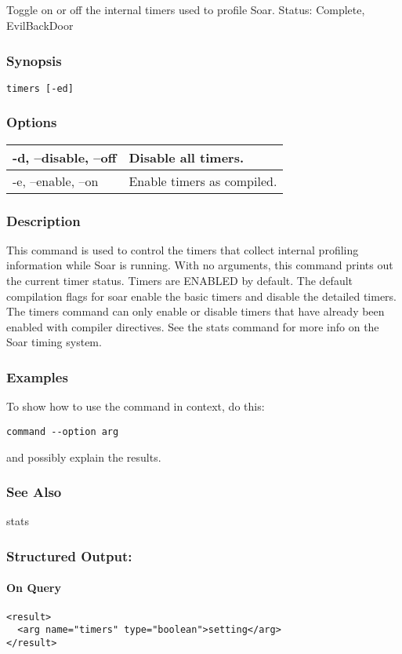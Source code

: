\subsection{}
\label{timers}
Toggle on or off the internal timers used to profile Soar. 
 Status: Complete, EvilBackDoor
\subsubsection*{Synopsis}
\begin{verbatim}
timers [-ed]
\end{verbatim}
\subsubsection*{Options}
\begin{tabular}{|l|l|}
\hline 
 -d, --disable, --off  & Disable all timers.  \\
 \hline 
 -e, --enable, --on  & Enable timers as compiled.  \\
 \hline 
\end{tabular}
\subsubsection*{Description}
 This command is used to control the timers that collect internal profiling information while Soar is running. With no arguments, this command prints out the current timer status. Timers are ENABLED by default. The default compilation flags for soar enable the basic timers and disable the detailed timers. The timers command can only enable or disable timers that have already been enabled with compiler directives. See the stats command for more info on the Soar timing system. 
\subsubsection*{Examples}
 To show how to use the command in context, do this: \begin{verbatim}
command --option arg
\end{verbatim}
 and possibly explain the results. 
\subsubsection*{See Also}
 stats
\subsubsection*{Structured Output:}
\paragraph*{On Query}
\begin{verbatim}
<result>
  <arg name="timers" type="boolean">setting</arg>
</result>
\end{verbatim}
